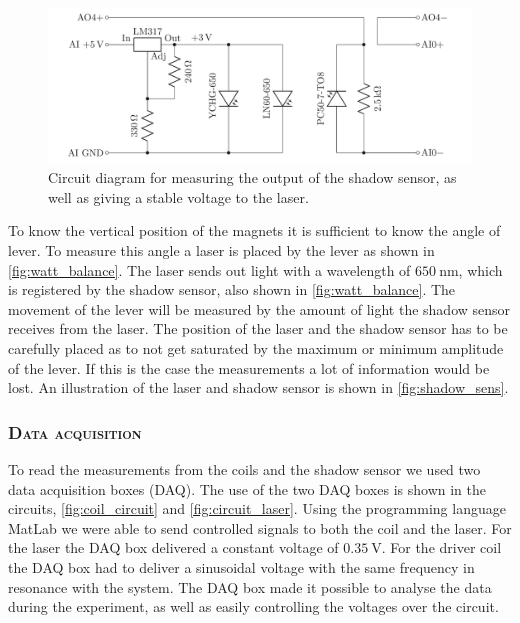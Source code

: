 \documentclass[english,a4paper,12pt,reprint]{revtex4-1}
\begin{document}
\begin{figure}
  \centering
  \includegraphics[scale=0.30]{laser_shadow_circuit.png}
  \caption{Circuit diagram for measuring the output of the shadow sensor, as well as giving a stable voltage to the laser.}
  \label{fig:circuit_laser}
\end{figure}

To know the vertical position of the magnets it is sufficient to know the angle of lever. To measure this angle a laser is placed by the lever as shown in \cref{fig:watt_balance}. The laser sends out light with a wavelength of $\SI{650}{\nano\meter}$, which is registered by the shadow sensor, also shown in \cref{fig:watt_balance}. The movement of the lever will be measured by the amount of light the shadow sensor receives from the laser. The position of the laser and the shadow sensor has to be carefully placed as to not get saturated by the maximum or minimum amplitude of the lever. If this is the case the measurements a lot of information would be lost. An illustration of the laser and shadow sensor is shown in \cref{fig:shadow_sens}.

\subsubsection{\textsc{Data acquisition}}
To read the measurements from the coils and the shadow sensor we used two data acquisition boxes (DAQ). The use of the two DAQ boxes is shown in the circuits, \vref{fig:coil_circuit} and \vref{fig:circuit_laser}. Using the programming language MatLab we were able to send controlled signals to both the coil and the laser. For the laser the DAQ box delivered a constant voltage of $\SI{0.35}{\volt}$. For the driver coil the DAQ box had to deliver a sinusoidal voltage with the same frequency in resonance with the system. The DAQ box made it possible to analyse the data during the experiment, as well as easily controlling the voltages over the circuit.
\end{document}
